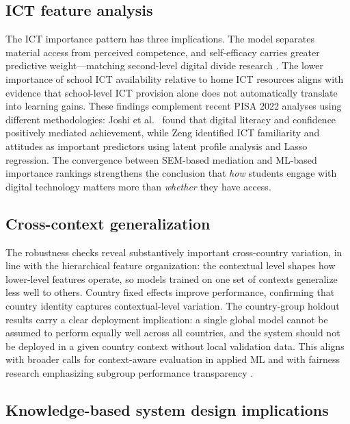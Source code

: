 \documentclass[review,12pt]{elsarticle}
\begin{document}
\subsection{ICT feature analysis}

The ICT importance pattern has three implications. The model separates material access from perceived competence, and self-efficacy carries greater predictive weight---matching second-level digital divide research \citep{Scheerder_2017,Hargittai_2010}. The lower importance of school ICT availability relative to home ICT resources aligns with evidence that school-level ICT provision alone does not automatically translate into learning gains. These findings complement recent PISA 2022 analyses using different methodologies: Joshi et al.\ \citep{Joshi_2025_digital_literacy} found that digital literacy and confidence positively mediated achievement, while Zeng \citep{Zeng_2025} identified ICT familiarity and attitudes as important predictors using latent profile analysis and Lasso regression. The convergence between SEM-based mediation and ML-based importance rankings strengthens the conclusion that \emph{how} students engage with digital technology matters more than \emph{whether} they have access.

\subsection{Cross-context generalization}

The robustness checks reveal substantively important cross-country variation, in line with the hierarchical feature organization: the contextual level shapes how lower-level features operate, so models trained on one set of contexts generalize less well to others. Country fixed effects improve performance, confirming that country identity captures contextual-level variation. The country-group holdout results carry a clear deployment implication: a single global model cannot be assumed to perform equally well across all countries, and the system should not be deployed in a given country context without local validation data. This aligns with broader calls for context-aware evaluation in applied ML and with fairness research emphasizing subgroup performance transparency \citep{Kizilcec_Lee_2022}.

\subsection{Knowledge-based system design implications}
\end{document}
